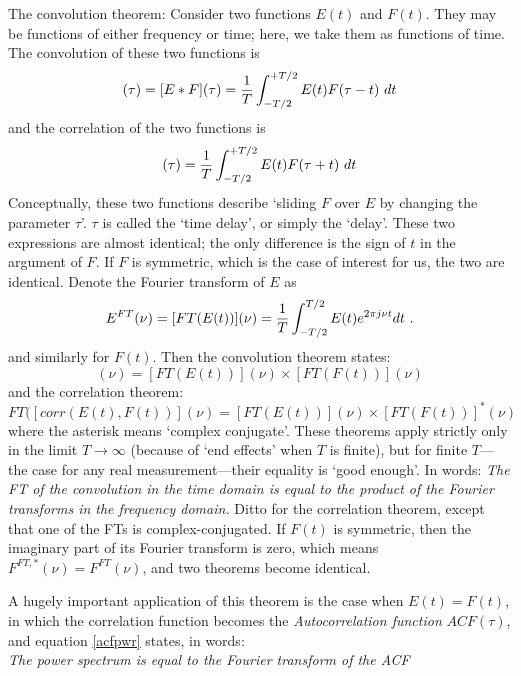 \documentclass[12pt,preprint]{aastex}
\begin{document}
The convolution theorem: Consider two functions $E(t)$ and $F(t)$. They
may be functions of either frequency or time; here, we take them as
functions of time. The convolution of these two functions is
%
\begin{equation}
[convol(E(t),F(t))](\tau) = [E * F](\tau) = 
       {1 \over T} \int_{-T/2}^{+T/2} E(t) F(\tau - t) \ dt
\end{equation}
%
and the correlation of the two functions is
%
\begin{equation}
[corr(E,F)](\tau) = 
       {1 \over T} \int_{-T/2}^{+T/2} E(t) F(\tau + t) \ dt
\end{equation}
%
\noindent Conceptually, these two functions describe `sliding $F$ over
$E$ by changing the parameter $\tau$'. $\tau$ is called the `time
delay', or simply the `delay'. These two expressions are almost
identical; the only difference is the sign of $t$ in the argument of
$F$. If $F$ is symmetric, which is the case of interest for us, the two
are identical. Denote the Fourier transform of $E$ as
%
\begin {equation}
E^{FT}(\nu) = [FT (E(t))](\nu) = {1 \over T} \int_{-T/2}^{T/2} E(t) e^{2 \pi j \nu t} dt \ .
\end{equation}
% 
and similarly for $F(t)$. Then the convolution theorem states:
%
\begin{equation}
[FT(convol(E(t),F(t)) ](\nu) = [FT (E(t))](\nu) \times  [FT(F(t))](\nu) 
\end{equation}
%
and the correlation theorem:
\begin{equation} \label{acfpwr}
FT([corr(E(t),F(t))](\nu) = [FT (E(t))](\nu) \times  [FT(F(t))]^*(\nu) 
\end{equation}
%
where the asterisk means `complex conjugate'. These theorems apply
strictly only in the limit $T \rightarrow \infty$ (because of `end
effects' when $T$ is finite), but for finite $T$---the case for any real
measurement---their equality is `good enough'. In words: {\it The FT of
  the convolution in the time domain is equal to the product of the
  Fourier transforms in the frequency domain.} Ditto for the correlation
theorem, except that one of the FTs is complex-conjugated.  If $F(t)$ is
symmetric, then the imaginary part of its Fourier transform is zero,
which means $F^{FT,*}(\nu) = F^{FT}(\nu)$, and two theorems become
identical.

A hugely important application of this theorem is the case when
$E(t)=F(t)$, in which the correlation function becomes the {\it
  Autocorrelation function} $ACF(\tau)$, and equation \ref{acfpwr}
states, in words: \\ {\it The power spectrum is equal to the Fourier
  transform of the ACF}
\end{document}
